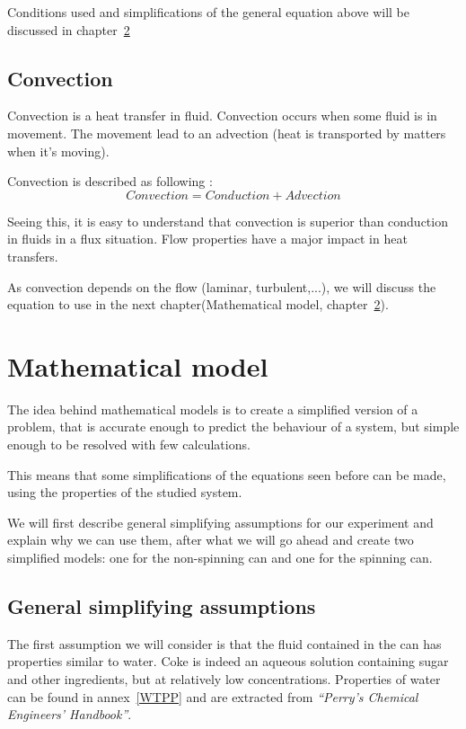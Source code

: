 \documentclass{report}
\begin{document}
	Conditions used and simplifications of the general equation above will be discussed in chapter~\ref{mm}
		
	\section{Convection}\label{cv}
	
	Convection is a heat transfer in fluid. Convection occurs when some fluid is in movement. The movement lead to an advection (heat is transported by matters when it's moving).
	
	Convection is described as following :
	\begin{equation}
		Convection = Conduction + Advection
	\end{equation}
	
	Seeing this, it is easy to understand that convection is superior than conduction in fluids in a flux situation. Flow properties have a major impact in heat transfers.
	
	As convection depends on the flow (laminar, turbulent,...), we will discuss the equation to use in the next chapter(Mathematical model, chapter~\ref{mm}).
	
	\chapter{Mathematical model}\label{mm}
	
	The idea behind mathematical models is to create a simplified version of a problem, that is accurate enough to predict the behaviour of a system, but simple enough to be resolved with few calculations.
	
	This means that some simplifications of the equations seen before can be made, using the properties of the studied system.
	
	We will first describe general simplifying assumptions for our experiment and explain why we can use them, after what we will go ahead and create two simplified models: one for the non-spinning can and one for the spinning can.
	
	\section{General simplifying assumptions}\label{gsa}
	
	The first assumption we will consider is that the fluid contained in the can has properties similar to water. Coke is indeed an aqueous solution containing sugar and other ingredients, but at relatively low concentrations.
	Properties of water can be found in annex~\ref{WTPP} and are extracted from \emph{``Perry’s Chemical Engineers’ Handbook''\cite{properties}}.
	
\end{document}
